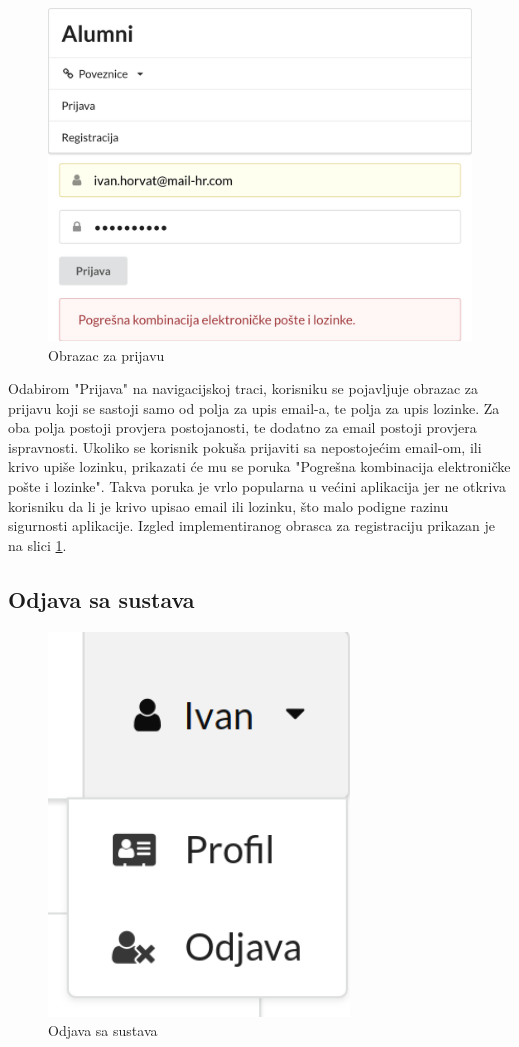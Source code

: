 \documentclass[zavrsni, numeric]{fer}
\begin{document}
\begin{figure}[H]
	\centering
	\includegraphics[width=13cm]{slike/prijava.png}
	\caption{Obrazac za prijavu}
	\label{fig:prijava}
\end{figure}

Odabirom "Prijava" na navigacijskoj traci, korisniku se pojavljuje obrazac za prijavu koji se sastoji samo od polja za upis email-a, te polja za upis lozinke. Za oba polja postoji provjera postojanosti, te dodatno za email postoji provjera ispravnosti. Ukoliko se korisnik pokuša prijaviti sa nepostojećim email-om, ili krivo upiše lozinku, prikazati će mu se poruka "Pogrešna kombinacija elektroničke pošte i lozinke". Takva poruka je vrlo popularna u većini aplikacija jer ne otkriva korisniku da li je krivo upisao email ili lozinku, što malo podigne razinu sigurnosti aplikacije. Izgled implementiranog obrasca za registraciju prikazan je na slici \ref{fig:prijava}.

\subsection{Odjava sa sustava}

\begin{figure}[H]
	\centering
	\includegraphics[width=8cm]{slike/odjava.png}
	\caption{Odjava sa sustava}
	\label{fig:odjava}
\end{figure}
\end{document}
